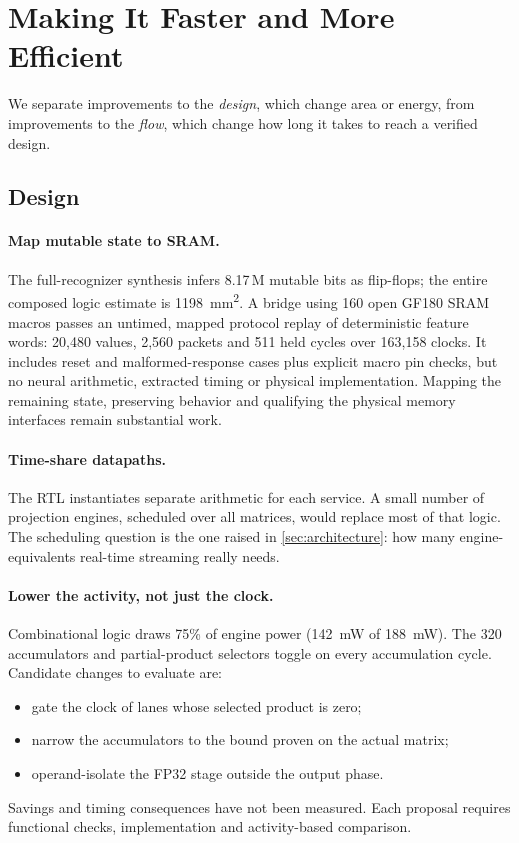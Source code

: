 \section{Making It Faster and More Efficient}
\label{sec:efficiency}

We separate improvements to the \emph{design}, which change area or energy, from improvements to the \emph{flow}, which change how long it takes to reach a verified design.

\subsection{Design}
\paragraph{Map mutable state to SRAM.}
The full-recognizer synthesis infers 8.17\,M mutable bits as flip-flops; the entire composed logic estimate is \SI{1198}{mm^2}. A bridge using 160 open GF180 SRAM macros passes an untimed, mapped protocol replay of deterministic feature words: 20,480 values, 2,560 packets and 511 held cycles over 163,158 clocks. It includes reset and malformed-response cases plus explicit macro pin checks, but no neural arithmetic, extracted timing or physical implementation. Mapping the remaining state, preserving behavior and qualifying the physical memory interfaces remain substantial work.

\paragraph{Time-share datapaths.}
The RTL instantiates separate arithmetic for each service. A small number of projection engines, scheduled over all matrices, would replace most of that logic. The scheduling question is the one raised in \cref{sec:architecture}: how many engine-equivalents real-time streaming really needs.

\paragraph{Lower the activity, not just the clock.}
Combinational logic draws 75\% of engine power (\SI{142}{mW} of \SI{188}{mW}). The 320 accumulators and partial-product selectors toggle on every accumulation cycle. Candidate changes to evaluate are:
\begin{itemize}
\item gate the clock of lanes whose selected product is zero;
\item narrow the accumulators to the bound proven on the actual matrix;
\item operand-isolate the FP32 stage outside the output phase.
\end{itemize}
Savings and timing consequences have not been measured. Each proposal requires functional checks, implementation and activity-based comparison.

